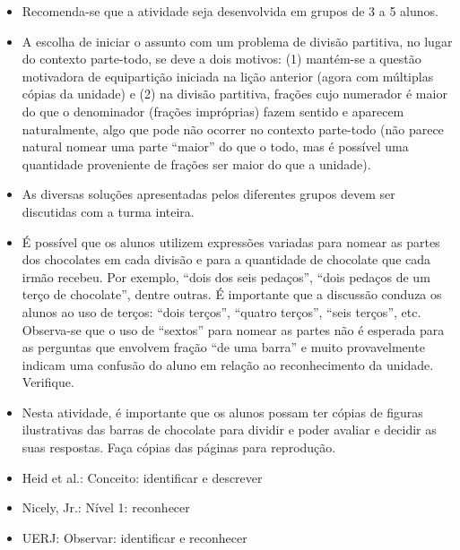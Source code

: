 \begin{multicols}{2}
\begin{itemize} %
    \item       Recomenda-se que a atividade seja desenvolvida em grupos de 3 a 5 alunos.
    \item       A escolha de iniciar o assunto com um problema de divisão partitiva, no lugar do contexto parte-todo, se deve a dois motivos: (1) mantém-se a questão motivadora de equipartição iniciada na lição anterior (agora com múltiplas cópias da unidade) e (2) na divisão partitiva, frações cujo numerador é maior do que o denominador (frações impróprias) fazem sentido e aparecem naturalmente, algo que pode não ocorrer no contexto parte-todo (não parece natural nomear uma parte       ``maior'' do que o todo, mas é possível uma quantidade proveniente de frações ser maior do que a unidade).
    \item       As diversas soluções apresentadas pelos diferentes grupos devem ser discutidas com a turma inteira.
    \item       É possível que os alunos utilizem expressões variadas para nomear as partes dos chocolates em cada divisão e para a quantidade de chocolate que cada irmão recebeu. Por exemplo,       ``dois dos seis pedaços'',       ``dois pedaços de um terço de chocolate'', dentre outras. É importante que a discussão conduza os alunos ao uso de terços:       ``dois terços'',       ``quatro terços'',       ``seis terços'', etc. Observa-se que o uso de       ``sextos''     para nomear as partes não é esperada para as perguntas que envolvem fração       ``de uma barra'' e muito provavelmente indicam uma confusão do aluno em relação ao reconhecimento da unidade. Verifique.
    \item       Nesta atividade, é importante que os alunos possam ter cópias de figuras ilustrativas das barras de chocolate para dividir e poder avaliar e decidir as suas respostas. Faça cópias das páginas para reprodução.
\end{itemize} %

\vspace{.1cm}

 \vspace{.1cm}
\begin{itemize} %
    \item       Heid et al.: Conceito: identificar e descrever
    \item       Nicely, Jr.: Nível 1: reconhecer
    \item       UERJ: Observar: identificar e reconhecer
\end{itemize} %


\end{multicols}
